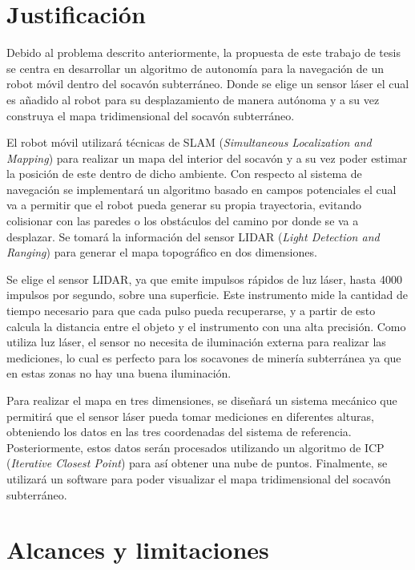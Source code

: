 \section{Justificación}

Debido al problema descrito anteriormente, la propuesta de este trabajo de tesis 
se centra en desarrollar un algoritmo de autonomía para la navegaci\'on de un robot 
m\'ovil dentro del socav\'on subterr\'aneo. Donde se elige un sensor l\'aser el 
cual es añadido al robot para su desplazamiento de manera aut\'onoma y a su vez 
construya el mapa tridimensional del socavón subterr\'aneo.

El robot m\'ovil utilizar\'a t\'ecnicas de SLAM (\textit{Simultaneous Localization 
and Mapping}) para realizar un mapa del interior del socav\'on y a su vez poder 
estimar la posici\'on de este dentro de dicho ambiente. Con respecto al sistema 
de navegaci\'on se implementar\'a un algoritmo basado en campos potenciales el 
cual va a permitir que el robot pueda generar su propia trayectoria, evitando 
colisionar con las paredes o los obst\'aculos del camino por donde se va a 
desplazar. Se tomar\'a la informaci\'on del sensor LIDAR (\textit{Light 
Detection and Ranging}) para generar el mapa topogr\'afico en dos dimensiones.

Se elige el sensor LIDAR, ya que emite impulsos r\'apidos de luz l\'aser, hasta 
4000 impulsos por segundo, sobre una superficie. Este instrumento mide la 
cantidad de tiempo necesario para que cada pulso pueda recuperarse, y a partir 
de esto calcula la distancia entre el objeto y el instrumento con una alta 
precisi\'on. Como utiliza luz l\'aser, el sensor no necesita de iluminaci\'on 
externa para realizar las mediciones, lo cual es perfecto para los socavones 
de miner\'ia subterránea ya que en estas zonas no hay una buena iluminaci\'on. 

Para realizar el mapa en tres dimensiones, se diseñar\'a un sistema mec\'anico 
que permitir\'a que el sensor l\'aser pueda tomar mediciones en diferentes 
alturas, obteniendo los datos en las tres coordenadas del sistema de 
referencia. Posteriormente, estos datos serán procesados utilizando un 
algoritmo de ICP (\textit{Iterative Closest Point}) para as\'i obtener una 
nube de puntos. Finalmente, se utilizar\'a un software para poder visualizar 
el mapa tridimensional del socavón subterr\'aneo.

\section{Alcances y limitaciones}

